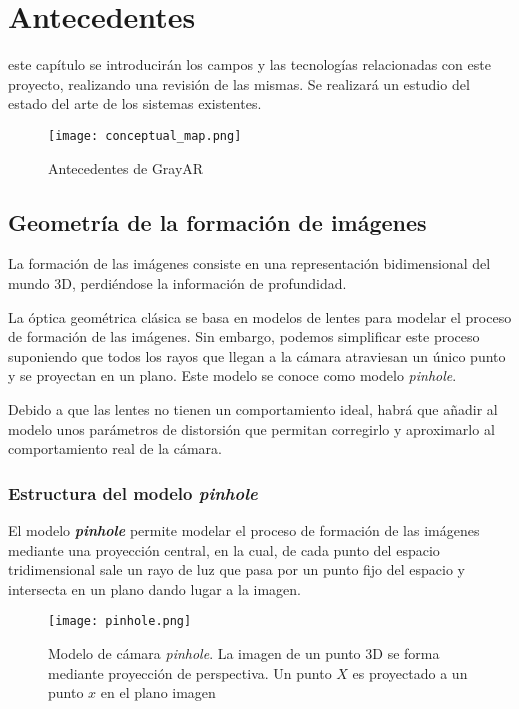 \chapter{Antecedentes}
\label{chap:antecedentes}

 este capítulo se introducirán los campos y las tecnologías relacionadas con este
proyecto, realizando una revisión de las mismas. Se realizará un estudio del estado del
arte de los sistemas existentes.

\begin{figure}[h!] 
  \centering
  \texttt{[image: conceptual\_map.png]}
  \caption{Antecedentes de GrayAR}
  \label{fig:antecedentes}
\end{figure}


\section{Geometría de la formación de imágenes}
La formación de las imágenes consiste en una representación bidimensional del mundo 3D, perdiéndose la información de profundidad.

La óptica geométrica clásica se basa en modelos de lentes para modelar el proceso de formación de las imágenes. Sin embargo, podemos simplificar este proceso suponiendo que todos los rayos que llegan a la cámara atraviesan un único punto y se proyectan en un plano. Este modelo se conoce como modelo \emph{pinhole}.

Debido a que las lentes no tienen un comportamiento ideal, habrá que añadir al modelo unos parámetros de distorsión que permitan corregirlo y aproximarlo al comportamiento real de la cámara.

\subsection{Estructura del modelo \textit{pinhole}}
El modelo \textbf{\textit{pinhole}} \cite{Hartley} permite modelar el proceso de formación de las imágenes mediante una proyección central, en la cual, de cada punto del espacio tridimensional sale un rayo de luz que pasa por un punto fijo del espacio y intersecta en un plano dando lugar a la imagen.

\begin{figure}[h!]
  \centering
  \texttt{[image: pinhole.png]}
  \caption{Modelo de cámara \textit{pinhole}. La imagen de un punto 3D se forma mediante proyección de perspectiva. Un punto $X$ es proyectado a un punto $x$ en el plano imagen}
  \label{fig:pinholeCamera}
\end{figure}

